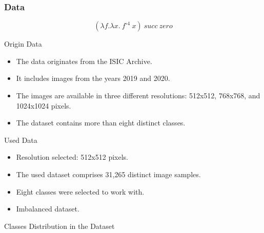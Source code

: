\documentclass[dvipsnames,mathserif]{beamer}
\begin{document}
{    \begin{frame}
      \frametitle{Data}

      \[(\lambda f. \lambda x.\ f^{\circ 4}\ x)\ succ\ zero\]
    \end{frame}

    \begin{frame}

      \large Origin Data
      \vspace{0.25cm}

      \footnotesize

      \begin{itemize}
        \item The data originates from the ISIC Archive.
        \item It includes images from the years 2019 and 2020.
        \item The images are available in three different resolutions: 512x512,
          768x768, and 1024x1024 pixels.
        \item The dataset contains more than eight distinct classes.
      \end{itemize}

    \end{frame}


    \begin{frame}

      \large Used Data
      \vspace{0.25cm}

      \footnotesize

      \begin{itemize}
        \item Resolution selected: 512x512 pixels.
        \item The used dataset comprises 31,265 distinct image samples.
        \item Eight classes were selected to work with.
        \item Imbalanced dataset.
      \end{itemize}

    \end{frame}

    \begin{frame}

      \large Classes Distribution in the Dataset
      \vspace{0.25cm}


\end{frame}}
\end{document}
